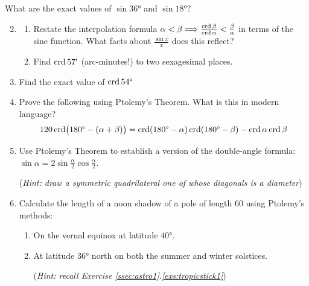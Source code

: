 \begin{exercises}{}{}
	\exstart What are the exact values of $\sin\ang{36}$ and $\sin\ang{18}$?
	
	\begin{enumerate}\setcounter{enumi}{1}
	  \item\begin{enumerate}
	    \item Restate the interpolation formula $\alpha<\beta\Longrightarrow \frac{\crd\beta}{\crd\alpha}<\frac\beta\alpha$ in terms of the sine function. What facts about $\frac{\sin x}x$ does this reflect?
	    \item Find $\crd 57'$ (arc-minutes!) to two sexagesimal places.
	  \end{enumerate} 
	  
	  \item Find the exact value of $\crd \ang{54}$
	  
	  \item%
	  Prove the following using Ptolemy's Theorem. What is this in modern language?
	  \[
	  	120\crd\bigl(\ang{180} -(\alpha+\beta)\bigr) 
	  	=\crd(\ang{180}-\alpha)\crd(\ang{180}-\beta) -\crd\alpha\crd\beta
	  \]
	  
	  \item Use Ptolemy's Theorem to establish a version of the double-angle formula: $\sin \alpha=2\sin\frac\alpha 2\cos\frac\alpha 2$.\par
	  (\emph{Hint: draw a symmetric quadrilateral one of whose diagonals is a diameter})
	  
	  
	  \item%
	  Calculate the length of a noon shadow of a pole of length 60 using Ptolemy's methods:
	  \begin{enumerate}
	    \item On the vernal equinox at latitude $\ang{40}$.
	  	\item%
	  	At latitude \ang{36} north on both the summer and winter solstices.\par
	  (\emph{Hint: recall Exercise \ref*{ssec:astro1}.\ref{exs:tropicstick1}})
	  \end{enumerate}
	\end{enumerate}
\end{exercises}